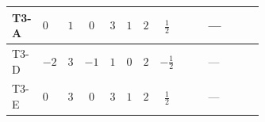 \documentclass[8pt]{article}
\begin{document}
\begin{landscape}
\begin{longtable}{@{}llcccccc >{\raggedright\arraybackslash}p{0.21\linewidth} >{\raggedright\arraybackslash}p{0.21\linewidth} >{\raggedright\arraybackslash}p{0.21\linewidth}@{}}
\midrule
T3-A & $0$ & $1$ & $0$ & $3$ & $1$ & $2$ & $\frac{1}{2}$ & \scriptsize\adjustbox{max width=\linewidth}{$\begin{gathered} +4 {\lambda_{H2}}^2\end{gathered}$} & --- & \scriptsize\adjustbox{max width=\linewidth}{$\begin{gathered} +14 {\lambda_{S_2}}^2\end{gathered}$} \\
\midrule
T3-D & $-2$ & $3$ & $-1$ & $1$ & $0$ & $2$ & $-\frac{1}{2}$ & \scriptsize\adjustbox{max width=\linewidth}{$\begin{gathered} +4 {\lambda_{H2}}^2\end{gathered}$} & --- & \scriptsize\adjustbox{max width=\linewidth}{$\begin{gathered} +10 {\lambda_{S_2}}^2\end{gathered}$} \\
\midrule
T3-E & $0$ & $3$ & $0$ & $3$ & $1$ & $2$ & $\frac{1}{2}$ & \scriptsize\adjustbox{max width=\linewidth}{$\begin{gathered} +4 {\lambda_{H2}}^2\end{gathered}$} & --- & \scriptsize\adjustbox{max width=\linewidth}{$\begin{gathered} +14 {\lambda_{S_2}}^2\end{gathered}$} \\
\midrule
\bottomrule
\end{longtable}
\clearpage

\end{landscape}
\end{document}
